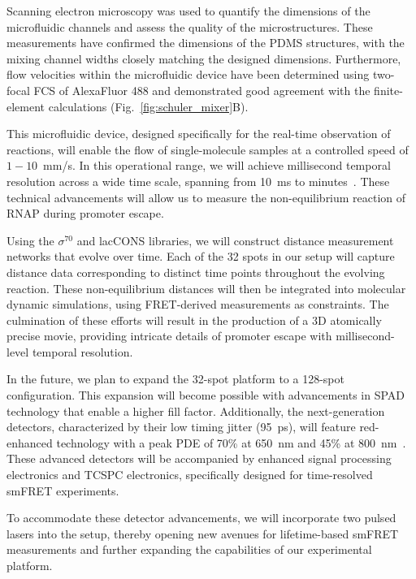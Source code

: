 Scanning electron microscopy was used to quantify the dimensions of the microfluidic channels and assess the quality of the microstructures. 
These measurements have confirmed the dimensions of the \ac{PDMS} structures, with the mixing channel widths closely matching the designed dimensions. 
Furthermore, flow velocities within the microfluidic device have been determined using two-focal \ac{FCS} of AlexaFluor 488 and demonstrated good agreement with the finite-element calculations (Fig.~\ref{fig:schuler_mixer}B).

This microfluidic device, designed specifically for the real-time observation of reactions, will enable the flow of single-molecule samples at a controlled speed of $1-10$~mm/s. 
In this operational range, we will achieve millisecond temporal resolution across a wide time scale, spanning from 10~ms to minutes~\cite{segal_methods_2019}.
These technical advancements will allow us to measure the non-equilibrium reaction of \ac{RNAP} during promoter escape.

Using the $\sigma^{70}$ and \ac{lacCONS} libraries, we will construct distance measurement networks that evolve over time. 
Each of the 32 spots in our setup will capture distance data corresponding to distinct time points throughout the evolving reaction. 
These non-equilibrium distances will then be integrated into molecular dynamic simulations, using FRET-derived measurements as constraints. 
The culmination of these efforts will result in the production of a 3D atomically precise movie, providing intricate details of promoter escape with millisecond-level temporal resolution.

In the future, we plan to expand the 32-spot platform to a 128-spot configuration. 
This expansion will become possible with advancements in \ac{SPAD} technology that enable a higher fill factor. 
Additionally, the next-generation detectors, characterized by their low timing jitter (95~ps), will feature red-enhanced technology with a peak \ac{PDE} of 70\% at 650~nm and 45\% at 800~nm~\cite{gulinatti_OE_2021}. 
These advanced detectors will be accompanied by enhanced signal processing electronics and \ac{TCSPC} electronics, specifically designed for time-resolved \ac{smFRET} experiments.

To accommodate these detector advancements, we will incorporate two pulsed lasers into the setup, thereby opening new avenues for lifetime-based \ac{smFRET} measurements and further expanding the capabilities of our experimental platform.